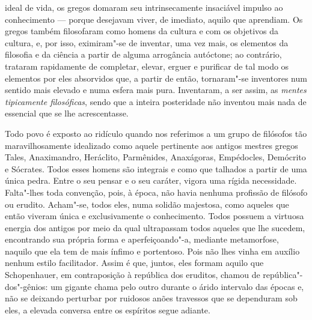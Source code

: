 ideal de vida, os gregos domaram seu intrinsecamente insaciável impulso ao
conhecimento --- porque desejavam viver, de imediato, aquilo que aprendiam. Os
gregos também filosofaram como homens da cultura e com os objetivos da
cultura, e, por isso, eximiram"-se de inventar, uma vez mais, os elementos da
filosofia e da ciência a partir de alguma arrogância autóctone; ao contrário,
trataram rapidamente de completar, elevar, erguer e purificar de tal modo os
elementos por eles absorvidos que, a partir de então, tornaram"-se inventores
num sentido mais elevado e numa esfera mais pura. Inventaram, a ser assim,
as \textit{mentes tipicamente filosóficas}, sendo que a inteira posteridade
não inventou mais nada de essencial que se lhe acrescentasse.

Todo povo é exposto ao ridículo quando nos referimos a um grupo de filósofos
tão maravilhosamente idealizado como aquele pertinente aos antigos mestres
gregos Tales, Anaximandro, Heráclito, Parmênides, Anaxágoras, Empédocles,
Demócrito e Sócrates. Todos esses homens são integrais e como que talhados a
partir de uma única pedra. Entre o seu pensar e o seu caráter, vigora uma
rígida necessidade. Falta"-lhes toda convenção, pois, à época, não havia
nenhuma profissão de filósofo ou erudito. Acham"-se, todos eles, numa solidão
majestosa, como aqueles que então viveram única e exclusivamente o
conhecimento. Todos possuem a virtuosa energia dos antigos por meio da qual
ultrapassam todos aqueles que lhe sucedem, encontrando sua própria forma e
aperfeiçoando"-a, mediante metamorfose, naquilo que ela tem de mais ínfimo e
portentoso. Pois não lhes vinha em auxílio nenhum estilo facilitador. Assim é
que, juntos, eles formam aquilo que Schopenhauer, em contraposição à
república dos eruditos, chamou de república"-dos"-gênios: um gigante chama
pelo outro durante o árido intervalo das épocas e, não se deixando perturbar
por ruidosos anões travessos que se dependuram sob eles, a elevada conversa
entre os espíritos segue adiante.

